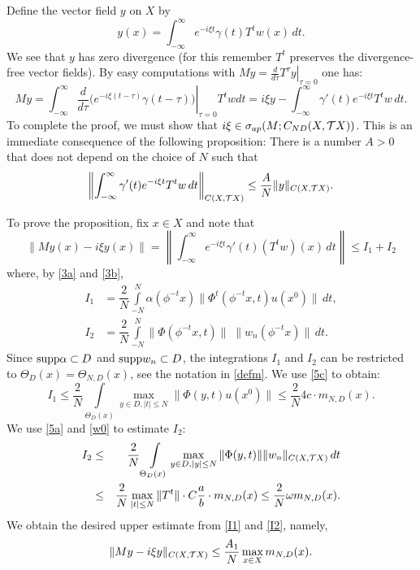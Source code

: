 \begin{pf}
Define the  vector field $y$ on $X$ by
$$
y(x) = \int^{\infty}_{-\infty} e^{-i\xi t}
\gamma(t) T^tw(x)\, dt.
$$
 We see that $y$ has zero divergence (for
this remember $T^t$ preserves the divergence-free vector fields).
By easy computations with $My=\left.\frac{d}{d\tau}T^\tau
y\right|_{\tau=0}$ one has:
 $$
My=\int^{\infty}_{-\infty}\left.\dfrac{d}{d\tau}\big(e^{-i\xi
(t-\tau)}\gamma (t-\tau)\big)\right|_{\tau=0}T^twdt =i\xi
y-\int^{\infty}_{-\infty} \gamma '(t)e^{-i\xi t}T^tw\,dt. $$
To complete the proof, we must show that  $i\xi \in
\sigma_{ap}(M;{C_{ND}(X,{{\cal{T}}X})})$. This is an immediate consequence of the
following proposition: There is a number $A>0$  that
does not depend on the choice of $N$ such that
$$\left\|
\int^{\infty}_{-\infty}
\gamma ' (t)e^{-i\xi t} T^tw \,dt\right\|_{C(X,{{\cal{T}}X})} \le
{\displaystyle{A\over N}} \|y\|_{C(X,{{\cal{T}}X})}.
$$

To prove the proposition, fix $x\in X$ and note that
\begin{equation*}
\|My(x) - i\xi y(x)\| =
  \left\| \int^{\infty}_{-\infty} e^{-i\xi t}
\gamma'(t)(T^tw)(x)\,dt\right \|\le I_1
+I_2
\end{equation*}
where, by \eqref{3a} and \eqref{3b},
\begin{eqnarray*}
I_1 & = \dfrac{2}{N} \int\limits^N_{-N}
\alpha (\phi^{-t}x) \|
\Phi^t(\phi^{-t}x,t)u(x^0)\| \,dt,\\
I_2 & = \dfrac{2}{N} \int\limits^N_{-N}
\|\Phi(\phi^{-t}x,t)\| \;
\|w_n(\phi^{-t}x) \| \,dt.
\end{eqnarray*}
Since $\hbox{\rm supp} \alpha\subset D$
and $\hbox{\rm supp} w_n \subset D$,
the integrations $I_1$ and $I_2$
can be restricted to $\Theta_D(x)=\Theta_{N,D}(x)$,
see the notation
in \eqref{defm}.
We use \eqref{5c} to obtain:
\begin{equation}\label{I1}
I_1\leq \dfrac{2}{N}\int\limits_{\Theta_D(x)}
\max_{y\in D,|t|\leq N}\|\Phi(y,t)u(x^0)\|
\leq \dfrac{2}{N} 4 c \cdot m_{N,D}(x).
\end{equation}
We use \eqref{5a} and \eqref{w0} to estimate $I_2$:
\begin{eqnarray}
 I_2 &\leq & {\displaystyle{2\over N}}\int\limits_{\Theta_D(x)}
\max_{y\in D,|y|\leq
N}\|\Phi(y,t)\|\|w_n\|_{C(X,{{\cal{T}}X})}\,dt\label{I2} \\
&\leq &
{\displaystyle{2\over N}} \max_{|t|\leq N}\|T^t\| \cdot
C{\displaystyle{a\over b}}\cdot m_{N,D}(x)
 \leq{\displaystyle{2\over N}} \omega m_{N,D}(x). \nonumber
\end{eqnarray}
We obtain the desired upper estimate from \eqref{I1} and \eqref{I2}, namely,
\begin{equation}\label{above}
\|My-i\xi y\|_{C(X,{{\cal{T}}X})} \le
{\displaystyle{A_1\over N}}\max_{x\in X}m_{N,D}(x).
\end{equation}


\end{pf}
